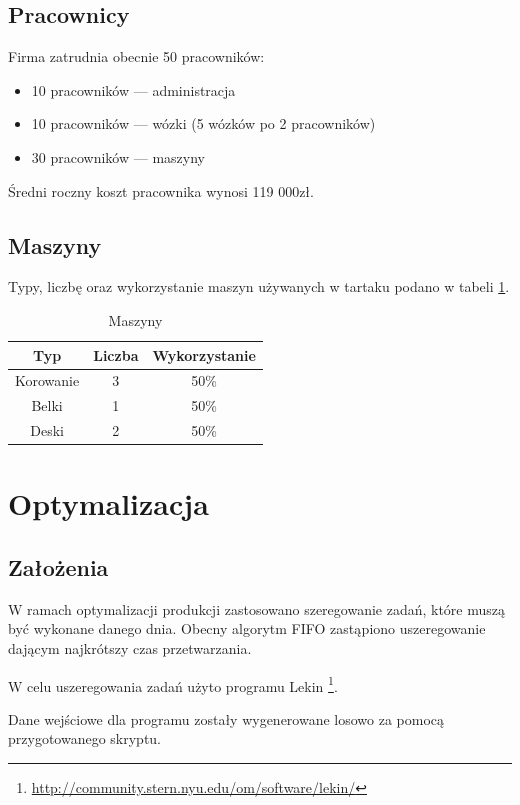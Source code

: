 \documentclass{article}
\begin{document}
\subsection{Pracownicy}

Firma zatrudnia obecnie 50 pracowników:

\begin{itemize}
	\item{10 pracowników --- administracja}
	\item{10 pracowników --- wózki (5 wózków po 2 pracowników)}
	\item{30 pracowników --- maszyny}
\end{itemize}

Średni roczny koszt pracownika wynosi 119 000zł.

\subsection{Maszyny}

Typy, liczbę oraz wykorzystanie maszyn używanych w tartaku podano w tabeli \ref{table:mch}.

\begin{table}[H]
\center
\begin{tabular}{ c | c | c }
  \textbf{Typ} & \textbf{Liczba} & \textbf{Wykorzystanie} \\ \hline
  Korowanie & 3 & 50\% \\
  Belki & 1 & 50\% \\
  Deski & 2 & 50\% \\
\end{tabular}
\caption{Maszyny}
\label{table:mch}
\end{table}

\section{Optymalizacja}

\subsection{Założenia}
W ramach optymalizacji produkcji zastosowano szeregowanie zadań, które muszą być wykonane danego dnia.
Obecny algorytm FIFO zastąpiono uszeregowanie dającym najkrótszy czas przetwarzania.

W celu uszeregowania zadań użyto programu Lekin \footnote{\url{http://community.stern.nyu.edu/om/software/lekin/}}.

Dane wejściowe dla programu zostały wygenerowane losowo za pomocą przygotowanego skryptu.
\end{document}

